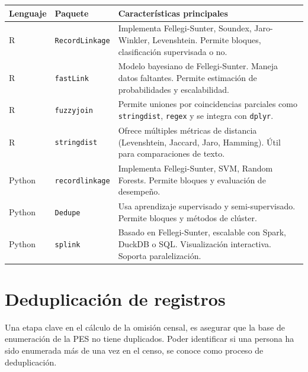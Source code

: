 \documentclass[
  12pt,
]{book}
\begin{document}
\begin{longtable}[]{@{}
  >{\raggedright\arraybackslash}p{}
  >{\raggedright\arraybackslash}p{}
  >{\raggedright\arraybackslash}p{}@{}}
\toprule\noalign{}
\begin{minipage}[b]{\linewidth}\raggedright
Lenguaje
\end{minipage} & \begin{minipage}[b]{\linewidth}\raggedright
Paquete
\end{minipage} & \begin{minipage}[b]{\linewidth}\raggedright
Características principales
\end{minipage} \\
\midrule\noalign{}
\endhead
\bottomrule\noalign{}
\endlastfoot
R & \texttt{RecordLinkage} & Implementa Fellegi-Sunter, Soundex, Jaro-Winkler, Levenshtein. Permite bloques, clasificación supervisada o no. \\
R & \texttt{fastLink} & Modelo bayesiano de Fellegi-Sunter. Maneja datos faltantes. Permite estimación de probabilidades y escalabilidad. \\
R & \texttt{fuzzyjoin} & Permite uniones por coincidencias parciales como \texttt{stringdist}, \texttt{regex} y se integra con \texttt{dplyr}. \\
R & \texttt{stringdist} & Ofrece múltiples métricas de distancia (Levenshtein, Jaccard, Jaro, Hamming). Útil para comparaciones de texto. \\
Python & \texttt{recordlinkage} & Implementa Fellegi-Sunter, SVM, Random Forests. Permite bloques y evaluación de desempeño. \\
Python & \texttt{Dedupe} & Usa aprendizaje supervisado y semi-supervisado. Permite bloques y métodos de clúster. \\
Python & \texttt{splink} & Basado en Fellegi-Sunter, escalable con Spark, DuckDB o SQL. Visualización interactiva. Soporta paralelización. \\
\end{longtable}

\section{Deduplicación de registros}\label{deduplicaciuxf3n-de-registros}

Una etapa clave en el cálculo de la omisión censal, es asegurar que la base de enumeración de la PES no tiene duplicados. Poder identificar si una persona ha sido enumerada más de una vez en el censo, se conoce como proceso de deduplicación.
\end{document}
